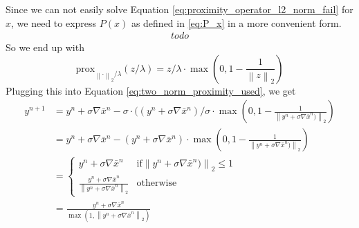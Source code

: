 \documentclass{paper}
\newcommand{\prox}{\text{prox}}
\newcommand{\twonorm}[1]{\left\lVert#1\right\rVert_2}
\begin{document}
Since we can not easily solve Equation \eqref{eq:proximity_operator_l2_norm_fail} for $x$, we need to express $P(x)$ as defined in \eqref{eq:P_x} in a more convenient form.
\begin{align}
todo
\end{align}
So we end up with
\begin{equation}
	\prox_{\twonorm{\cdot} / \lambda}(z / \lambda) =
	z / \lambda \cdot \max \left(0 , 1 - \frac{1}{\twonorm{z}} \right)
\end{equation}
Plugging this into Equation \eqref{eq:two_norm_proximity_used}, we get
\begin{align}
	y^{n+1} &= y^n + \sigma \nabla \bar{x}^n - 
			   \sigma \cdot ((y^n + \sigma \nabla \bar{x}^n) / \sigma \cdot
			   \max \left(0, 1 - \frac{1}{\twonorm{y^n + \sigma \nabla \bar{x}^n)}} \right) \\
			&= y^n + \sigma \nabla \bar{x}^n - 
			   (y^n + \sigma \nabla \bar{x}^n) \cdot
			   \max \left(0, 1 - \frac{1}{\twonorm{y^n + \sigma \nabla \bar{x}^n)}} \right) \\
			&= \begin{cases}
   				y^n + \sigma \nabla \bar{x}^n  			
   						& \text{if} \twonorm{y^n + \sigma \nabla \bar{x}^n)} \leq 1 \\
   				\frac{y^n + \sigma \nabla \bar{x}^n}
				    {\twonorm{y^n + \sigma \nabla \bar{x}^n}}      
				    		& \text{otherwise}
  			 \end{cases} \\
			&= \frac{y^n + \sigma \nabla \bar{x}^n}
				    {\max \left(1, \twonorm{y^n + \sigma \nabla \bar{x}^n}\right)}
\end{align}
\end{document}

